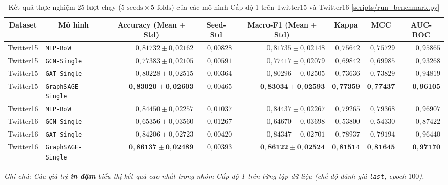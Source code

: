 \documentclass[11pt,a4paper]{extreport}
\newcommand{\ghrepo}{https://github.com/pqui-345/BiGCN-Plus-Rumor-Detection/blob/main}
\newcommand{\coderef}[2]{\textnormal{[\href{\ghrepo/#1}{#2}]}}
\begin{document}
\begin{table}[htbp]
    \centering
    \caption[Kết quả 25 lượt của 4 mô hình cơ sở Cấp độ 1]{Kết quả thực nghiệm $25$ lượt chạy ($5\text{ seeds} \times 5\text{ folds}$) của các mô hình Cấp độ 1 trên Twitter15 và Twitter16 \coderef{scripts/run_benchmark.py}{scripts/run\_benchmark.py}}
    \label{tab:level1-results}
    \footnotesize
    \setlength{\tabcolsep}{4pt}
    \begin{tabular}{@{}llrrrrrr@{}}
        \toprule
        \multicolumn{1}{c}{\textbf{Dataset}} & \multicolumn{1}{c}{\textbf{Mô hình}} & \multicolumn{1}{c}{\textbf{Accuracy (Mean $\pm$ Std)}} & \multicolumn{1}{c}{\textbf{Seed-Std}} & \multicolumn{1}{c}{\textbf{Macro-F1 (Mean $\pm$ Std)}} & \multicolumn{1}{c}{\textbf{Kappa}} & \multicolumn{1}{c}{\textbf{MCC}} & \multicolumn{1}{c}{\textbf{AUC-ROC}} \\
        \midrule
        Twitter15 & \texttt{MLP-BoW}          & $0{,}81732 \pm 0{,}02162$ & $0{,}00828$ & $0{,}81735 \pm 0{,}02148$ & $0{,}75642$ & $0{,}75729$ & $0{,}95865$ \\
        Twitter15 & \texttt{GCN-Single}       & $0{,}77383 \pm 0{,}02105$ & $0{,}00591$ & $0{,}77417 \pm 0{,}02079$ & $0{,}69842$ & $0{,}69985$ & $0{,}93268$ \\
        Twitter15 & \texttt{GAT-Single}       & $0{,}80228 \pm 0{,}02515$ & $0{,}00364$ & $0{,}80296 \pm 0{,}02505$ & $0{,}73636$ & $0{,}73829$ & $0{,}94819$ \\
        Twitter15 & \texttt{GraphSAGE-Single} & $\mathbf{0{,}83020 \pm 0{,}02603}$ & $0{,}00465$ & $\mathbf{0{,}83034 \pm 0{,}02593}$ & $\mathbf{0{,}77359}$ & $\mathbf{0{,}77437}$ & $\mathbf{0{,}96105}$ \\
        \addlinespace[4pt]
        Twitter16 & \texttt{MLP-BoW}          & $0{,}84450 \pm 0{,}02257$ & $0{,}01037$ & $0{,}84437 \pm 0{,}02267$ & $0{,}79265$ & $0{,}79368$ & $0{,}96907$ \\
        Twitter16 & \texttt{GCN-Single}       & $0{,}65356 \pm 0{,}03560$ & $0{,}01267$ & $0{,}64670 \pm 0{,}03698$ & $0{,}53800$ & $0{,}54330$ & $0{,}87422$ \\
        Twitter16 & \texttt{GAT-Single}       & $0{,}84206 \pm 0{,}02723$ & $0{,}00420$ & $0{,}84347 \pm 0{,}02701$ & $0{,}78937$ & $0{,}79194$ & $0{,}96440$ \\
        Twitter16 & \texttt{GraphSAGE-Single} & $\mathbf{0{,}86137 \pm 0{,}02489}$ & $0{,}00393$ & $\mathbf{0{,}86122 \pm 0{,}02524}$ & $\mathbf{0{,}81514}$ & $\mathbf{0{,}81645}$ & $\mathbf{0{,}97170}$ \\
        \bottomrule
    \end{tabular}
    \par\vspace{3pt}
    {\footnotesize\textit{Ghi chú: Các giá trị \textbf{in đậm} biểu thị kết quả cao nhất trong nhóm Cấp độ 1 trên từng tập dữ liệu (chế độ đánh giá \texttt{last}, epoch $100$).}}
\end{table}
\end{document}
